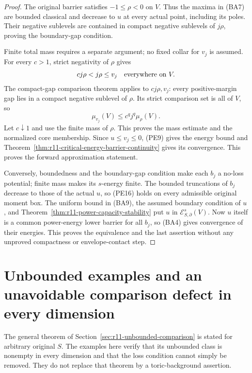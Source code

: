\documentclass[11pt,a4paper]{article}
\numberwithin{equation}{section}
\theoremstyle{definition}
\theoremstyle{remark}
\begin{document}
\begin{proof}
The original barrier satisfies $-1\leq\rho<0$ on $V$.
Thus the maxima in (BA7) are bounded classical and decrease
to $u$ at every actual point, including its poles. Their
negative sublevels are contained in compact negative sublevels
of $j\rho$, proving the boundary-gap condition.

Finite total mass requires a separate argument; no fixed collar
for $v_j$ is assumed. For every $c>1$, strict negativity of
$\rho$ gives
\[
                          cj\rho<j\rho\leq v_j
                                     \quad\hbox{everywhere on }V.
\]
The compact-gap comparison theorem applies to $cj\rho,v_j$:
every positive-margin gap lies in a compact negative sublevel
of $\rho$. Its strict comparison set is all of $V$, so
\[
                 \mu_{v_j}(V)\leq c^q j^q\mu_\rho(V).
\]
Let $c\downarrow1$ and use the finite mass of $\rho$.
This proves the mass estimate and the normalized core membership.
Since $u\leq v_j\leq0$, (PE9) gives the energy bound and
Theorem~\ref{thm:r11-critical-energy-barrier-continuity} gives
its convergence. This proves the forward approximation statement.

Conversely, boundedness and the boundary-gap condition make each
$b_j$ a no-loss potential; finite mass makes its $s$-energy
finite. The bounded truncations of $b_j$ decrease to those
of the actual $u$, so (PE16) holds on every admissible original
moment box. The uniform bound in (BA9), the assumed boundary
condition of $u$, and Theorem~\ref{thm:r11-power-capacity-stability}
put $u$ in $\mathcal E^s_{S,\partial}(V)$. Now $u$ itself
is a common power-energy lower barrier for all $b_j$, so
(BA4) gives convergence of their energies. This proves the
equivalence and the last assertion without any unproved
compactness or envelope-contact step.
\end{proof}



\section{Unbounded examples and an unavoidable comparison defect in every dimension}
\label{sec:r11-radial-unbounded-energy}

The general theorem of Section~\ref{sec:r11-unbounded-comparison}
is stated for arbitrary original $S$. The examples here verify
that its unbounded class is nonempty in every dimension and that
the loss condition cannot simply be removed. They do not replace
that theorem by a toric-background assertion.
\end{document}
